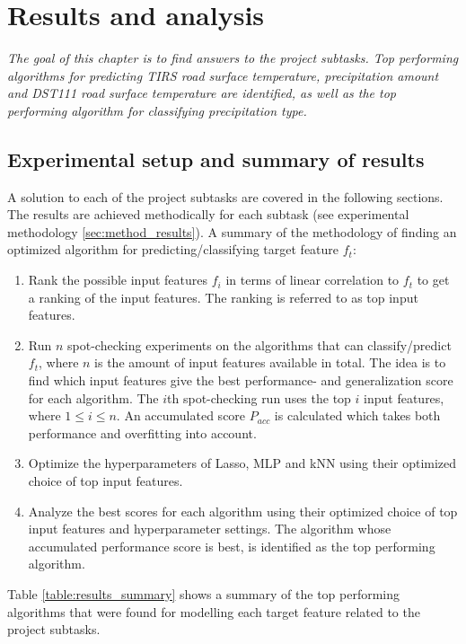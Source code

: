 \chapter{Results and analysis}
\emph{The goal of this chapter is to find answers to the project subtasks. Top performing algorithms for predicting TIRS road surface temperature, precipitation amount and DST111 road surface temperature are identified, as well as the top performing algorithm for classifying precipitation type.}

\section{Experimental setup and summary of results}
	A solution to each of the project subtasks are covered in the following sections. The results are achieved methodically for each subtask (see experimental methodology \ref{sec:method_results}). A summary of the methodology of finding an optimized algorithm for predicting/classifying target feature $f_t$:
	\begin{enumerate}
		\item Rank the possible input features $f_i$ in terms of linear correlation to $f_t$ to get a ranking of the input features. The ranking is referred to as top input features.
		\item Run $n$ spot-checking experiments on the algorithms that can classify/predict $f_t$, where $n$ is the amount of input features available in total. The idea is to find which input features give the best performance- and generalization score for each algorithm. The $i$th spot-checking run uses the top $i$ input features, where $1 \leq i \leq n$. An accumulated score $P_{acc}$ is calculated which takes both performance and overfitting into account.
		\item Optimize the hyperparameters of Lasso, MLP and kNN using their optimized choice of top input features.
		\item Analyze the best scores for each algorithm using their optimized choice of top input features and hyperparameter settings. The algorithm whose accumulated performance score is best, is identified as the top performing algorithm.
	\end{enumerate}

	Table \ref{table:results_summary} shows a summary of the top performing algorithms that were found for modelling each target feature related to the project subtasks.
	
